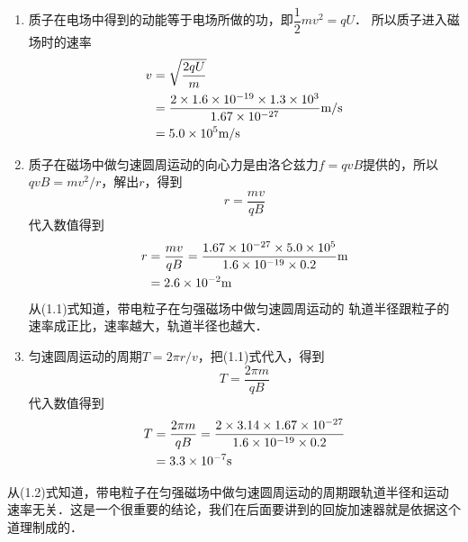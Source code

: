 \begin{solution}
    \begin{enumerate}
        \item 质子在电场中得到的动能等于电场所做的功，即$\dfrac{1}{2}mv^2=qU$．
        所以质子进入磁场时的速率
        \[\begin{split}
            v&=\sqrt{\frac{2qU}{m}}\\
            &=\frac{2\times 1.6\times 10^{-19}\times1.3\times10^3}{1.67\times 10^{-27}}\text{m}/\text{s}\\
            &=5.0\times 10^5\text{m}/\text{s}
        \end{split}\]
        \item 质子在磁场中做匀速圆周运动的向心力是由洛仑兹力$f=qvB$提供的，所以$qvB=mv^2/r$，解出$r$，得到
        \begin{equation}
            r=\frac{mv}{qB}
        \end{equation}
        代入数值得到
       \[\begin{split}
           r&=\frac{mv}{qB}=\frac{1.67\times 10^{-27}\times 5.0\times 10^5}{1.6\times 10^{-19}\times 0.2}{\rm m}\\
           &=2.6\times 10^{-2}{\rm m}
       \end{split}\]
        从(1.1)式知道，带电粒子在匀强磁场中做匀速圆周运动的
        轨道半径跟粒子的速率成正比，速率越大，轨道半径也越大．
        
        \item 匀速圆周运动的周期$T=2\pi r/v$，把(1.1)式代入，得到
\begin{equation}
    T=\frac{2\pi m}{qB}
\end{equation}
        代入数值得到
        \[\begin{split}
            T&=\frac{2\pi m}{qB}=\frac{2\times 3.14\times 1.67\times 10^{-27}}{1.6\times 10^{-19}\times 0.2}\\
            &=3.3\times 10^{-7}{\rm s}
        \end{split}\]
    \end{enumerate}
\end{solution}

从(1.2)式知道，带电粒子在匀强磁场中做匀速圆周运动的周期跟轨道半径和运动速率无关．这是一个很重要的结论，我们在后面要讲到的回旋加速器就是依据这个道理制成的．
        
